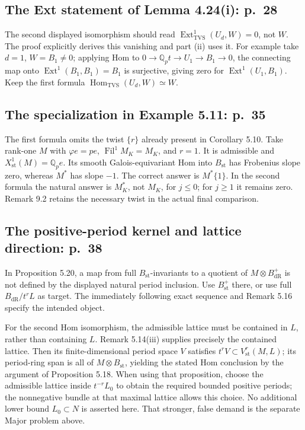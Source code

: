 \documentclass[10pt]{article}
\begin{document}
\subsection*{The Ext statement of Lemma 4.24(i): p. 28}
The second displayed isomorphism should read \(\operatorname{Ext}^1_{\mathrm{TVS}}(U_d,W)=0\), not \(W\). The proof explicitly derives this vanishing and part (ii) uses it. For example take \(d=1\), \(W=B_1\ne0\); applying Hom to \(0\to\mathbb Q_pt\to U_1\to B_1\to0\), the connecting map onto \(\operatorname{Ext}^1(B_1,B_1)=B_1\) is surjective, giving zero for \(\operatorname{Ext}^1(U_1,B_1)\). Keep the first formula \(\operatorname{Hom}_{\mathrm{TVS}}(U_d,W)\simeq W\).\par
\subsection*{The specialization in Example 5.11: p. 35}
The first formula omits the twist \(\{r\}\) already present in Corollary 5.10. Take rank-one \(M\) with \(\varphi e=pe\), \(\operatorname{Fil}^1M_K=M_K\), and \(r=1\). It is admissible and \(X_{\mathrm{st}}^1(M)=\mathbb Q_pe\). Its smooth Galois-equivariant Hom into \(B_{\mathrm{st}}\) has Frobenius slope zero, whereas \(M^*\) has slope \(-1\). The correct answer is \(M^*\{1\}\). In the second formula the natural answer is \(M_K^*\), not \(M_K\), for \(j\leq0\); for \(j\geq1\) it remains zero. Remark 9.2 retains the necessary twist in the actual final comparison.\par
\subsection*{The positive-period kernel and lattice direction: p. 38}
In Proposition 5.20, a map from full \(B_{\mathrm{st}}\)-invariants to a quotient of \(M\otimes B_{\mathrm{dR}}^+\) is not defined by the displayed natural period inclusion. Use \(B_{\mathrm{st}}^+\) there, or use full \(B_{\mathrm{dR}}/t^rL\) as target. The immediately following exact sequence and Remark 5.16 specify the intended object.\par
For the second Hom isomorphism, the admissible lattice must be contained in \(L\), rather than containing \(L\). Remark 5.14(iii) supplies precisely the contained lattice. Then its finite-dimensional period space \(V\) satisfies \(t^rV\subset V_{\mathrm{st}}^r(M,L)\); its period-ring span is all of \(M\otimes B_{\mathrm{st}}\), yielding the stated Hom conclusion by the argument of Proposition 5.18. When using that proposition, choose the admissible lattice inside \(t^{-r}L_0\) to obtain the required bounded positive periods; the nonnegative bundle at that maximal lattice allows this choice. No additional lower bound \(L_0\subset N\) is asserted here. That stronger, false demand is the separate Major problem above.\par
\end{document}
